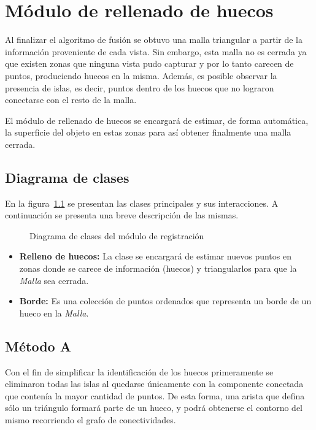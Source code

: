 \chapter{Módulo de rellenado de huecos}
	Al finalizar el algoritmo de fusión se obtuvo una malla triangular a partir
	de la información proveniente de cada vista.
	Sin embargo, esta malla no es cerrada ya que existen zonas que ninguna
	vista pudo capturar y por lo tanto carecen de puntos, produciendo huecos en la misma.
	Además, es posible observar la presencia de islas, es decir, puntos dentro de los huecos que no lograron conectarse con el resto de la malla.

	El módulo de rellenado de huecos se encargará de estimar, de forma automática, la superficie del
	objeto en estas zonas para así obtener finalmente una malla cerrada.

	\section{Diagrama de clases}
		En la figura~\ref{fig:filling_class} se presentan las clases principales y sus interacciones.
		A continuación se presenta una breve descripción de las mismas.
		\begin{figure}
			\caption{\label{fig:filling_class}Diagrama de clases del módulo de registración}
		\end{figure}

		\begin{itemize}
			\item {\bfseries Relleno de huecos:} La clase se encargará de estimar
				nuevos puntos en zonas donde se carece de información (huecos)
				y triangularlos para que la \emph{Malla} sea cerrada.
			\item {\bfseries Borde:} Es una colección de puntos ordenados
				que representa un borde de un hueco en la \emph{Malla}.
		\end{itemize}

	\section{Método A}
		Con el fin de simplificar la identificación de los huecos primeramente se eliminaron
		todas las islas al quedarse únicamente con la componente conectada que
		contenía la mayor cantidad de puntos.
		De esta forma, una arista que defina sólo un triángulo formará parte de un hueco,
		y podrá obtenerse el contorno del mismo recorriendo el grafo de conectividades. 

